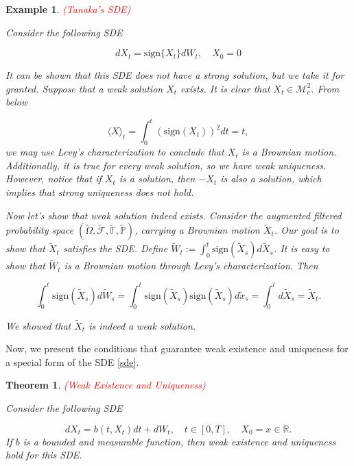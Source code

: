 \documentclass{article}
\newtheorem{theorem}{Theorem}
\newtheorem{ex}{Example}
\begin{document}
\begin{ex} \textcolor{red}{(Tanaka's SDE)}

Consider the following SDE

\begin{equation*}
dX_t = \text{sign}\{X_t\}dW_t, \quad X_0=0
\end{equation*}

It can be shown that this SDE does not have a strong solution, but we take it for granted. Suppose that a weak solution $X_t$ exists. It is clear that $X_t\in\mathcal{M}_c^2$. From below

\begin{equation*}
\langle X\rangle_t = \int_0^t(\text{sign}(X_t))^2dt=t,
\end{equation*}
we may use Levy's characterization to conclude that $X_t$ is a Brownian motion. Additionally, it is true for every weak solution, so we have weak uniqueness. However, notice that if $X_t$ is a solution, then $-X_t$ is also a solution, which implies that strong uniqueness does not hold.

Now let's show that weak solution indeed exists. Consider the augmented filtered probability space $(\tilde{\Omega},\tilde{\mathcal{F}},\tilde{\mathbb{F}},\tilde{\mathbb{P}})$, carrying a Brownian motion $\tilde{X}_t$. Our goal is to show that $\tilde{X}_t$ satisfies the SDE. Define $\tilde{W}_t:=\int^t_0\text{sign}(\tilde{X}_s)d\tilde{X}_s$. It is easy to show that $\tilde{W}_t$ is a Brownian motion through Levy's characterization. Then

\begin{equation*}
\int^t_0\text{sign}(\tilde{X}_s)d\tilde{W}_s=\int^t_0\text{sign}(\tilde{X}_s)\text{sign}(\tilde{X}_s)d\tilde{x}_s=\int^t_0d\tilde{X}_s=\tilde{X}_t.
\end{equation*}

We showed that $\tilde{X}_t$ is indeed a weak solution.
\end{ex}

Now, we present the conditions that guarantee weak existence and uniqueness for a special form of the SDE \eqref{sde}.

\begin{theorem} \label{thm:weak_exist_unique} \textcolor{red}{(Weak Existence and Uniqueness)}

Consider the following SDE

\begin{equation} \label{sde_weak_sol}
dX_t=b(t,X_t)dt+dW_t, \quad t\in[0,T], \quad X_0=x\in\mathbb{R}.
\end{equation}
If $b$ is a bounded and measurable function, then weak existence and uniqueness hold for this SDE.
\end{theorem}
\end{document}
